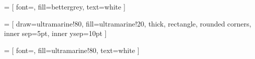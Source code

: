  =     [  font=\sffamily\large, 
                    fill=bettergrey,
                    text=white
                    ]

 = [       draw={ultramarine!80},
                    fill={ultramarine!20},
                    thick,
                    rectangle, 
                    rounded corners, 
                    inner sep=5pt, 
                    inner ysep=10pt
                    ]
                    
 = [  font=\sffamily\large,
                    fill={ultramarine!80},
                    text=white
                    ]
                    
\newcommand{\margininbox}[2]{
                        \begin{marginfigure}
                        \begin{tikzpicture}
                        \node [name-dest] (box){%
                            \begin{minipage}{0.9\textwidth}
                            \vspace{5pt}
                            #2
                            \end{minipage}
                        };
                        \node[fancytitle, right=10pt] at (box.north west) {#1};
                        \end{tikzpicture}
                        \end{marginfigure}
}



\newcommand{\fullwidthbox}[2]{
   \begin{figure*}[t!]        
        \begin{tikzpicture}
            \node [name-dest] (box){%
                \begin{minipage}{\textwidth}
                \vspace{5pt}
                    \begin{multicols}{2}
                    #2
                  \end{multicols}
                \end{minipage}
            };
            \node[fancytitle, right=10pt] at (box.north west) {#1};
        \end{tikzpicture}
    \end{figure*}
}


